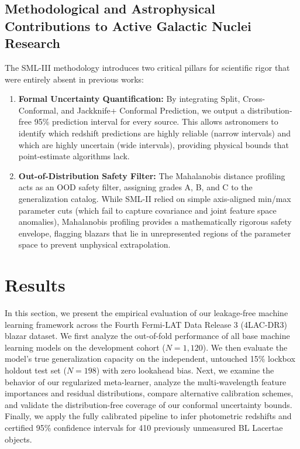 \documentclass[twocolumn,linenumbers,floatfix]{aastex701}
\begin{document}
\subsection{Methodological and Astrophysical Contributions to Active Galactic Nuclei Research}
The SML-III methodology introduces two critical pillars for scientific rigor that were entirely absent in previous works:
\begin{enumerate}
    \item \textbf{Formal Uncertainty Quantification:} By integrating Split, Cross-Conformal, and Jackknife+ Conformal Prediction, we output a distribution-free 95\% prediction interval for every source. This allows astronomers to identify which redshift predictions are highly reliable (narrow intervals) and which are highly uncertain (wide intervals), providing physical bounds that point-estimate algorithms lack.
    \item \textbf{Out-of-Distribution Safety Filter:} The Mahalanobis distance profiling acts as an OOD safety filter, assigning grades A, B, and C to the generalization catalog. While SML-II relied on simple axis-aligned min/max parameter cuts (which fail to capture covariance and joint feature space anomalies), Mahalanobis profiling provides a mathematically rigorous safety envelope, flagging blazars that lie in unrepresented regions of the parameter space to prevent unphysical extrapolation.
\end{enumerate}

\section{Results}
\label{sec:results}

In this section, we present the empirical evaluation of our leakage-free machine learning framework across the Fourth Fermi-LAT Data Release 3 (4LAC-DR3) blazar dataset. We first analyze the out-of-fold performance of all base machine learning models on the development cohort ($N=1{,}120$). We then evaluate the model's true generalization capacity on the independent, untouched 15\% lockbox holdout test set ($N=198$) with zero lookahead bias. Next, we examine the behavior of our regularized meta-learner, analyze the multi-wavelength feature importances and residual distributions, compare alternative calibration schemes, and validate the distribution-free coverage of our conformal uncertainty bounds. Finally, we apply the fully calibrated pipeline to infer photometric redshifts and certified 95\% confidence intervals for 410 previously unmeasured BL Lacertae objects.
\end{document}
